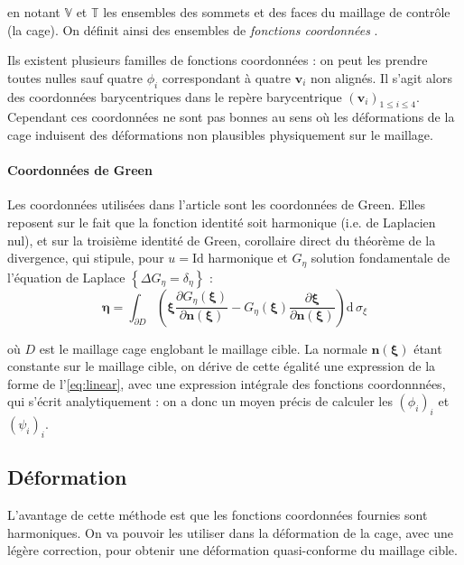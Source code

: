 \documentclass[10pt,a4paper]{article}
\begin{document}
en notant $\mathbb{V}$ et $\mathbb{T}$ les ensembles des sommets et des faces du maillage de contrôle (la cage). On définit ainsi des ensembles de \textit{fonctions coordonnées} .

Ils existent plusieurs familles de fonctions coordonnées : on peut les prendre toutes nulles sauf quatre $\phi_i$ correspondant à quatre $\mathbf{v}_i$ non alignés. Il s'agit alors des coordonnées barycentriques dans le repère barycentrique $\left( \mathbf{v}_i \right)_{1 \leq i \leq 4}$. Cependant ces coordonnées ne sont pas bonnes au sens où les déformations de la cage induisent des déformations non plausibles physiquement sur le maillage.

\paragraph{Coordonnées de Green}Les coordonnées utilisées dans l'article sont les coordonnées de Green. Elles reposent sur le fait que la fonction identité soit harmonique (i.e. de Laplacien nul), et sur la troisième identité de Green, corollaire direct du théorème de la divergence, qui stipule, pour $u = \mathrm{Id}$ harmonique et $G_\eta$ solution fondamentale de l'équation de Laplace $\left\lbrace \Delta G_\eta = \delta_\eta \right\rbrace$ :
\begin{equation}
\boldsymbol\eta = \int_{\partial D} \left(
	\boldsymbol\xi
		\frac{\partial G_\eta \left(\boldsymbol\xi \right)}
		{\partial \mathbf{n \left( \boldsymbol\xi \right)}}
	- G_\eta \left( \boldsymbol\xi \right) 
		\frac{\partial \boldsymbol\xi }
		{\partial \mathbf{n \left( \boldsymbol\xi \right)}}
\right)
\mathrm{d}\, \sigma_\xi
\end{equation}

où $D$ est le maillage cage englobant le maillage cible. La normale $\mathbf{n \left( \boldsymbol\xi \right)}$ étant constante sur le maillage cible, on dérive de cette égalité une expression de la forme de l'\autoref{eq:linear}, avec une expression intégrale des fonctions coordonnnées, qui s'écrit analytiquement : on a donc un moyen précis de calculer les $\left( \phi_i \right)_i$ et $\left( \psi_i \right)_i$.

\subsection{Déformation}

L'avantage de cette méthode est que les fonctions coordonnées fournies sont harmoniques. On va pouvoir les utiliser dans la déformation de la cage, avec une légère correction, pour obtenir une déformation quasi-conforme du maillage cible.
\end{document}
